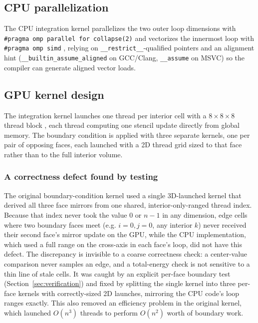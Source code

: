 \documentclass[conference]{IEEEtran}
\begin{document}
\subsection{CPU parallelization}

The CPU integration kernel parallelizes the two outer loop dimensions with
\texttt{\#pragma omp parallel for collapse(2)} and vectorizes the innermost loop with
\texttt{\#pragma omp simd} \cite{dagum1998}, relying on \texttt{\_\_restrict\_\_}-qualified
pointers and an alignment hint (\texttt{\_\_builtin\_assume\_aligned} on GCC/Clang,
\texttt{\_\_assume} on MSVC) so the compiler can generate aligned vector loads.

\subsection{GPU kernel design}

The integration kernel launches one thread per interior cell with a $8\times8\times8$
thread block \cite{nvidia-cuda}, each thread computing one stencil update directly from global memory.
The boundary condition is applied with three separate kernels, one per pair of
opposing faces, each launched with a 2D thread grid sized to that face rather than to
the full interior volume.

\subsubsection{A correctness defect found by testing}
\label{sec:bug}

The original boundary-condition kernel used a single 3D-launched kernel that derived
all three face mirrors from one shared, interior-only-ranged thread index. Because
that index never took the value $0$ or $n-1$ in any dimension, edge cells where two
boundary faces meet (e.g. $i=0, j=0$, any interior $k$) never received their second
face's mirror update on the GPU, while the CPU implementation, which used a full range
on the cross-axis in each face's loop, did not have this defect. The discrepancy is
invisible to a coarse correctness check: a center-value comparison never samples an
edge, and a total-energy check is not sensitive to a thin line of stale cells. It was
caught by an explicit per-face boundary test (Section~\ref{sec:verification}) and fixed
by splitting the single kernel into three per-face kernels with correctly-sized 2D
launches, mirroring the CPU code's loop ranges exactly. This also removed an efficiency
problem in the original kernel, which launched $O(n^3)$ threads to perform $O(n^2)$
worth of boundary work.
\end{document}
